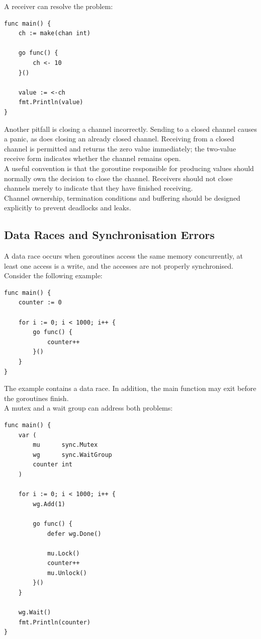 A receiver can resolve the problem:

\begin{lstlisting}
func main() {
    ch := make(chan int)

    go func() {
        ch <- 10
    }()

    value := <-ch
    fmt.Println(value)
}
\end{lstlisting}

Another pitfall is closing a channel incorrectly. Sending to a closed channel causes a panic, as does closing an already closed channel. Receiving from a closed channel is permitted and returns the zero value immediately; the two-value receive form indicates whether the channel remains open.\\

A useful convention is that the goroutine responsible for producing values should normally own the decision to close the channel. Receivers should not close channels merely to indicate that they have finished receiving.\\

Channel ownership, termination conditions and buffering should be designed explicitly to prevent deadlocks and leaks.

\subsection{Data Races and Synchronisation Errors}

A data race occurs when goroutines access the same memory concurrently, at least one access is a write, and the accesses are not properly synchronised.\\

Consider the following example:

\begin{lstlisting}
func main() {
    counter := 0

    for i := 0; i < 1000; i++ {
        go func() {
            counter++
        }()
    }
}
\end{lstlisting}

The example contains a data race. In addition, the main function may exit before the goroutines finish.\\

A mutex and a wait group can address both problems:

\begin{lstlisting}
func main() {
    var (
        mu      sync.Mutex
        wg      sync.WaitGroup
        counter int
    )

    for i := 0; i < 1000; i++ {
        wg.Add(1)

        go func() {
            defer wg.Done()

            mu.Lock()
            counter++
            mu.Unlock()
        }()
    }

    wg.Wait()
    fmt.Println(counter)
}
\end{lstlisting}

